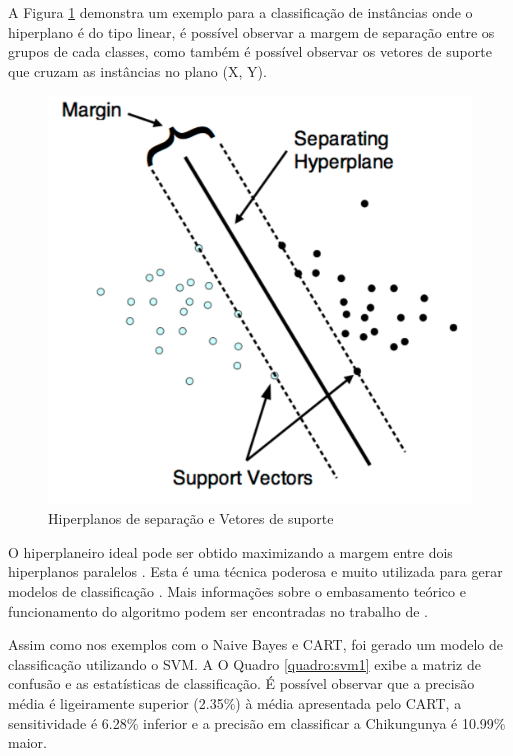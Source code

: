 A Figura \ref{fig:svm} demonstra um exemplo para a classificação de instâncias onde o hiperplano é do tipo linear, é possível observar a margem de separação entre os grupos de cada classes, como também é possível observar os vetores de suporte que cruzam as instâncias no plano (X, Y).

\begin{figure}[htb]
  \caption{\label{fig:svm}Hiperplanos de separação e Vetores de suporte }
  \begin{center}
    \includegraphics[scale=0.4]{imagens/svm.png}
  \end{center}
\end{figure}
\newpage

O hiperplaneiro ideal pode ser obtido maximizando a margem entre dois hiperplanos paralelos \cite{qi2013robust}. Esta é uma técnica  poderosa e muito utilizada para gerar modelos de classificação \cite{Meyer2017}. Mais informações sobre o embasamento teórico e funcionamento do algoritmo podem ser encontradas no trabalho de .

Assim como nos exemplos com o Naive Bayes e CART, foi gerado um modelo de classificação utilizando o SVM. A O Quadro \ref{quadro:svm1} exibe a matriz de confusão e as estatísticas de classificação. É possível observar que a precisão média é ligeiramente superior (2.35\%) à média apresentada pelo CART, a sensitividade é 6.28\% inferior e a precisão em classificar a Chikungunya é 10.99\% maior.

